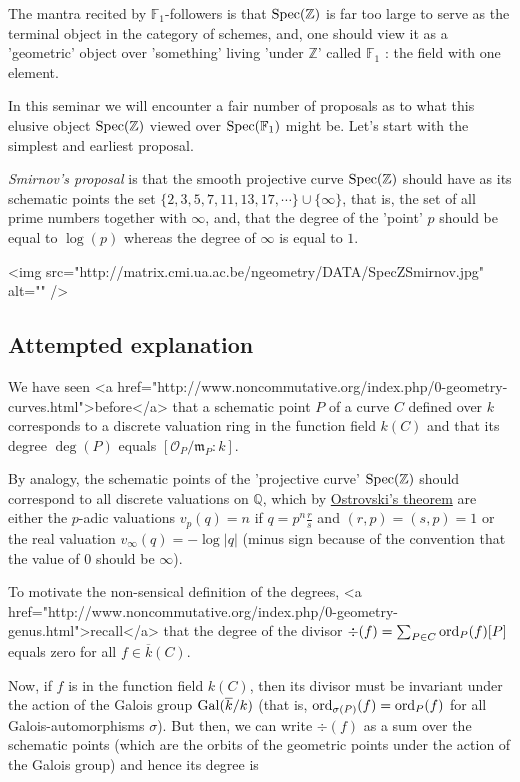 The mantra recited by $\mathbb{F}_1$-followers is that $\operatorname{Spec}(\mathbb{Z})$ is far too large to serve as the terminal object in the category of schemes, and, one should view it as a 'geometric' object over 'something' living 'under $\mathbb{Z}$' called $\mathbb{F}_1$ : the field with one element.

In this seminar we will encounter a fair number of proposals as to what this elusive object $\operatorname{Spec}(\mathbb{Z})$ viewed over $\operatorname{Spec}(\mathbb{F}_1)$ might be. Let's start with the simplest and earliest proposal.

\emph{Smirnov's proposal} is that the smooth projective curve $\operatorname{Spec}(\mathbb{Z})$ should have as its schematic points the set $\{ 2,3,5,7,11,13,17,\cdots \} \cup \{ \infty \}$, that is, the set of all prime numbers together with $\infty$, and, that the degree of the 'point' $p$ should be equal to $\log(p)$ whereas the degree of $\infty$ is equal to $1$.

<img src="http://matrix.cmi.ua.ac.be/ngeometry/DATA/SpecZSmirnov.jpg" alt="" />

\subsection{Attempted explanation}
We have seen <a href="http://www.noncommutative.org/index.php/0-geometry-curves.html">before</a> that a schematic point $P$ of a curve $C$ defined over $k$ corresponds to a discrete valuation ring in the function field $k(C)$ and that its degree $\deg(P)$ equals $[\mathcal{O}_P/\mathfrak{m}_P : k]$.

By analogy, the schematic points of the 'projective curve' $\operatorname{Spec}(\mathbb{Z})$ should correspond to all discrete valuations on $\mathbb{Q}$, which by \href{http://en.wikipedia.org/wiki/Ostrowski's_theorem}{Ostrovski's theorem} are either the $p$-adic valuations $v_p(q)=n$ if $q=p^n \frac{r}{s}$ and $(r,p)=(s,p)=1$ or the real valuation $v_{\infty}(q) = -\log |q|$ (minus sign because of the convention that the value of $0$ should be $\infty$).

To motivate the non-sensical definition of the degrees, <a href="http://www.noncommutative.org/index.php/0-geometry-genus.html">recall</a> that the degree of the divisor $\div(f) = \sum_{P \in C} \operatorname{ord}_P(f) [P]$ equals zero for all $f \in \overline{k}(C)$.

Now, if $f$ is in the function field $k(C)$, then its divisor must be invariant under the action of the Galois group $\operatorname{Gal}(\overline{k}/k)$ (that is, $\operatorname{ord}_{\sigma(P)}(f) = \operatorname{ord}_P(f)$ for all Galois-automorphisms $\sigma$). But then, we can write $\div(f)$ as a sum over the schematic points (which are the orbits of the geometric points under the action of the Galois group) and hence its degree is

